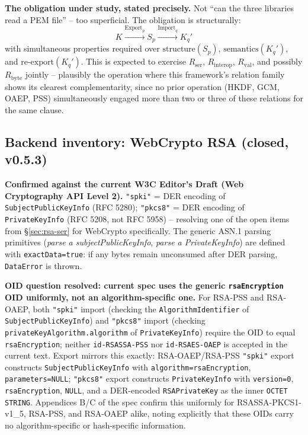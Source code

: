 \documentclass[11pt,a4paper]{article}
\begin{document}
\textbf{The obligation under study, stated precisely.} Not ``can the three libraries read a PEM file'' -- too superficial. The obligation is structurally:
\[K \xrightarrow{\text{Export}_p} S_p \xrightarrow{\text{Import}_q} K_q'\]
with simultaneous properties required over $\text{structure}(S_p)$, $\text{semantics}(K_q')$, and $\text{re-export}(K_q')$. This is expected to exercise $R_{\text{ser}}$, $R_{\text{interop}}$, $R_{\text{val}}$, and possibly $R_{\text{byte}}$ jointly -- plausibly the operation where this framework's relation family shows its clearest complementarity, since no prior operation (HKDF, GCM, OAEP, PSS) simultaneously engaged more than two or three of these relations for the same clause.

\subsection{Backend inventory: WebCrypto RSA (closed, v0.5.3)}\label{sec:rsa-ser-webcrypto}
\textbf{Confirmed against the current W3C Editor's Draft (Web Cryptography API Level 2).} \texttt{"spki"} = DER encoding of \texttt{SubjectPublicKeyInfo} (RFC 5280); \texttt{"pkcs8"} = DER encoding of \texttt{PrivateKeyInfo} (RFC 5208, not RFC 5958) -- resolving one of the open items from \S\ref{sec:rsa-ser} for WebCrypto specifically. The generic ASN.1 parsing primitives (\emph{parse a subjectPublicKeyInfo}, \emph{parse a PrivateKeyInfo}) are defined with \texttt{exactData=true}: if any bytes remain unconsumed after DER parsing, \texttt{DataError} is thrown.

\textbf{OID question resolved: current spec uses the generic \texttt{rsaEncryption} OID uniformly, not an algorithm-specific one.} For RSA-PSS and RSA-OAEP, both \texttt{"spki"} import (checking the \texttt{AlgorithmIdentifier} of \texttt{SubjectPublicKeyInfo}) and \texttt{"pkcs8"} import (checking \texttt{privateKeyAlgorithm.algorithm} of \texttt{PrivateKeyInfo}) require the OID to equal \texttt{rsaEncryption}; neither \texttt{id-RSASSA-PSS} nor \texttt{id-RSAES-OAEP} is accepted in the current text. Export mirrors this exactly: RSA-OAEP/RSA-PSS \texttt{"spki"} export constructs \texttt{SubjectPublicKeyInfo} with \texttt{algorithm=rsaEncryption}, \texttt{parameters=NULL}; \texttt{"pkcs8"} export constructs \texttt{PrivateKeyInfo} with \texttt{version=0}, \texttt{rsaEncryption}, \texttt{NULL}, and a DER-encoded \texttt{RSAPrivateKey} as the inner \texttt{OCTET STRING}. Appendices B/C of the spec confirm this uniformly for RSASSA-PKCS1-v1\_5, RSA-PSS, and RSA-OAEP alike, noting explicitly that these OIDs carry no algorithm-specific or hash-specific information.
\end{document}
